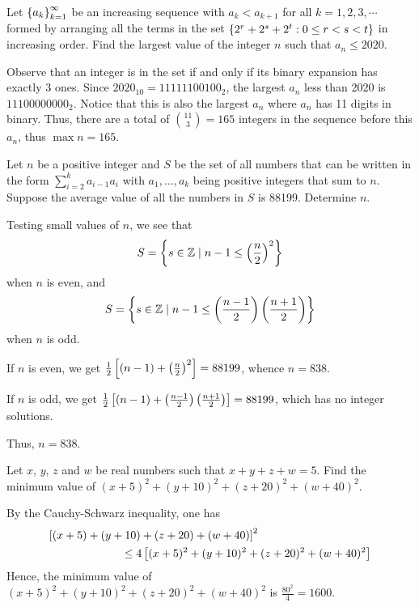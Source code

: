 \begin{question}[165]\label{A::2020-O-1-22}
    Let $\left\lbrace a_k \right\rbrace_{k=1}^\infty$ be an increasing sequence with $a_k < a_{k+1}$ for all $k = 1, 2, 3, \cdots$ formed by arranging all the terms in the set $\left\lbrace 2^r + 2^s + 2^t : 0 \leq r < s < t \right\rbrace$ in increasing order. Find the largest value of the integer $n$ such that $a_n \leq 2020$.
\end{question}
\begin{solution*}
    Observe that an integer is in the set if and only if its binary expansion has exactly 3 ones. Since $2020_{10} = 11111100100_{2}$, the largest $a_n$ less than 2020 is $11100000000_{2}$. Notice that this is also the largest $a_n$ where $a_n$ has 11 digits in binary. Thus, there are a total of $\binom{11}{3} = 165$ integers in the sequence before this $a_n$, thus $\max n = 165$.
\end{solution*}

\clearpage
\begin{question}[838]\label{A::2020-O-1-23}
    Let $n$ be a positive integer and $S$ be the set of all numbers that can be written in the form $\displaystyle\sum_{i = 2}^k a_{i-1}a_i$ with $a_1, \ldots, a_k$ being positive integers that sum to $n$. Suppose the average value of all the numbers in $S$ is 88199. Determine $n$.
\end{question}
\begin{solution*}
    Testing small values of $n$, we see that \[S = \left\lbrace s \in \mathbb{Z} \mid n-1 \leq \left( \frac{n}{2} \right)^2 \right\rbrace\] when $n$ is even, and \[S = \left\lbrace s \in \mathbb{Z} \mid n-1 \leq \left( \frac{n-1}{2} \right)\left( \frac{n+1}{2} \right) \right\rbrace\] when $n$ is odd.

     If $n$ is even, we get $\frac12 \left[ (n-1) + \left( \frac{n}{2} \right)^2 \right] = 88199$, whence $n = 838$.
    
     If $n$ is odd, we get $\frac12 \left[ (n-1) + \left( \frac{n-1}{2} \right)\left( \frac{n+1}{2} \right) \right] = 88199$, which has no integer solutions.
    
    Thus, $n = 838$.
\end{solution*}

\begin{question}[1600]\label{A::2020-O-1-24}
    Let $x$, $y$, $z$ and $w$ be real numbers such that $x + y + z + w = 5$. Find the minimum value of $(x + 5)^2 + (y + 10)^2 + (z + 20)^2 + (w + 40)^2$.
\end{question}
\begin{solution*}
    By the Cauchy-Schwarz inequality, one has
    \begin{align*}
        \bs{(x+5)+(y+10)+(z+20)+(w+40)}^2 \hspace{10em}\\
        \hspace{3em}\leq 4 \bs{(x + 5)^2 + (y + 10)^2 + (z + 20)^2 + (w + 40)^2}
    \end{align*}
    Hence, the minimum value of $(x + 5)^2 + (y + 10)^2 + (z + 20)^2 + (w + 40)^2$ is $\frac{80^2}4 = 1600$.
\end{solution*}

